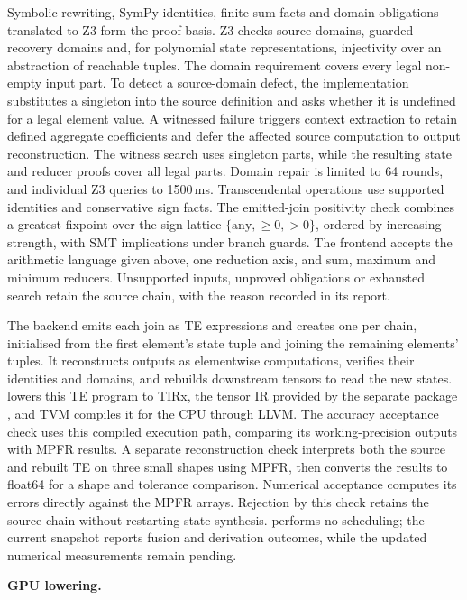Symbolic rewriting, SymPy identities, finite-sum facts and domain obligations translated to Z3 form the proof basis.
Z3 checks source domains, guarded recovery domains and, for polynomial state representations, injectivity over an abstraction of reachable tuples.
The domain requirement covers every legal non-empty input part.
To detect a source-domain defect, the implementation substitutes a singleton into the source definition and asks whether it is undefined for a legal element value.
A witnessed failure triggers context extraction to retain defined aggregate coefficients and defer the affected source computation to output reconstruction.
The witness search uses singleton parts, while the resulting state and reducer proofs cover all legal parts.
Domain repair is limited to 64 rounds, and individual Z3 queries to 1500\,ms.
Transcendental operations use supported identities and conservative sign facts.
The emitted-join positivity check combines a greatest fixpoint over the sign lattice $\{\text{any},\geq0,>0\}$, ordered by increasing strength, with SMT implications under branch guards.
The frontend accepts the arithmetic language given above, one reduction axis, and sum, maximum and minimum reducers.
Unsupported inputs, unproved obligations or exhausted search retain the source chain, with the reason recorded in its report.

The backend emits each join as TE expressions and creates one \commreducer per chain, initialised from the first element's state tuple and joining the remaining elements' tuples.
It reconstructs outputs as elementwise computations, verifies their identities and domains, and rebuilds downstream tensors to read the new states.
 lowers this TE program to TIRx, the tensor IR provided by the separate package , and TVM compiles it for the CPU through LLVM.
The accuracy acceptance check uses this compiled execution path, comparing its working-precision outputs with MPFR results.
A separate reconstruction check interprets both the source and rebuilt TE on three small shapes using MPFR, then converts the results to float64 for a shape and tolerance comparison.
Numerical acceptance computes its errors directly against the MPFR arrays.
Rejection by this check retains the source chain without restarting state synthesis.
\sys performs no scheduling; the current snapshot reports fusion and derivation outcomes, while the updated numerical measurements remain pending.

\textbf{GPU lowering.}\par
\label{sec:gpu}

